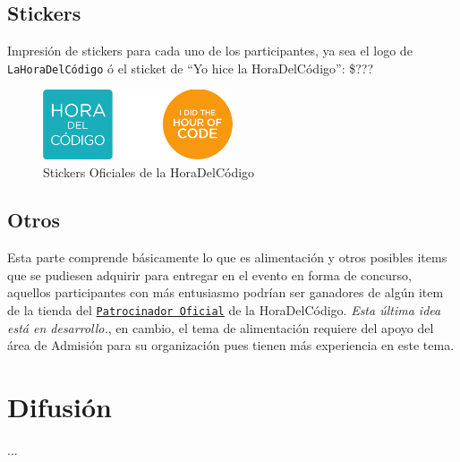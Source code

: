 \documentclass[letterpaper,12pt]{article}
\begin{document}
\subsection{Stickers}

Impresión de stickers para cada uno de los participantes, ya sea el logo de \texttt{LaHoraDelCódigo} ó el sticket de ``Yo hice la HoraDelCódigo'': \$???

\begin{figure}[H]
  \centering
    \includegraphics[width=0.5\textwidth]{sticker}
  \caption{Stickers Oficiales de la HoraDelCódigo}
\end{figure}

\subsection{Otros}

Esta parte comprende básicamente lo que es alimentación y otros posibles items que se pudiesen adquirir para entregar en el evento en forma de concurso, aquellos participantes con más entusiasmo podrían ser ganadores de algún item de la tienda del \texttt{\href{https://store.code.org/collections/featured-items/products/code-org-8-bit-sunglasses}{Patrocinador Oficial}} de la HoraDelCódigo. \emph{Esta última idea está en desarrollo.}, en cambio, el tema de alimentación requiere del apoyo del área de Admisión para su organización pues tienen más experiencia en este tema.

\section{Difusión}

...
\end{document}
